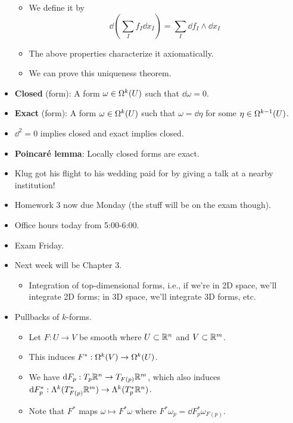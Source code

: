 \documentclass[../notes.tex]{subfiles}
\begin{document}
\begin{itemize}
    \begin{itemize}
        \item We define it by
        \begin{equation*}
            \dd{\left( \sum_If_I\dd{x_I} \right)} = \sum_I\dd{f_I}\wedge\dd{x_I}
        \end{equation*}
        \item The above properties characterize it axiomatically.
        \item We can prove this uniqueness theorem.
    \end{itemize}
    \item \textbf{Closed} (form): A form $\omega\in\ome[k]{U}$ such that $\dd{\omega}=0$.
    \item \textbf{Exact} (form): A form $\omega\in\ome[k]{U}$ such that $\omega=\dd{\eta}$ for some $\eta\in\ome[k-1]{U}$.
    \item $\dd^2=0$ implies closed and exact implies closed.
    \item \textbf{Poincar\'{e} lemma}: Locally closed forms are exact.
    \item {}Klug got his flight to his wedding paid for by giving a talk at a nearby institution!
    \item Homework 3 now due Monday (the stuff will be on the exam though).
    \item Office hours today from 5:00-6:00.
    \item Exam Friday.
    \item Next week will be Chapter 3.
    \begin{itemize}
        \item Integration of top-dimensional forms, i.e., if we're in 2D space, we'll integrate 2D forms; in 3D space, we'll integrate 3D forms, etc.
    \end{itemize}
    \item Pullbacks of $k$-forms.
    \begin{itemize}
        \item Let $F:U\to V$ be smooth where $U\subset\R^n$ and $V\subset\R^m$.
        \item This induces $F^*:\ome[k]{V}\to\ome[k]{U}$.
        \item We have $\dd{F_p}:T_p\R^n\to T_{F(p)}\R^m$, which also induces $\dd{F_p^*}:\lam[k]{T_{F(p)}^*\R^m}\to\lam[k]{T_p^*\R^n}$.
        \item Note that $F^*$ maps $\omega\mapsto F^*\omega$ where $F^*\omega_p=\dd{F_p^*\omega_{F(p)}}$.
    \end{itemize}

\end{itemize}
\end{document}
